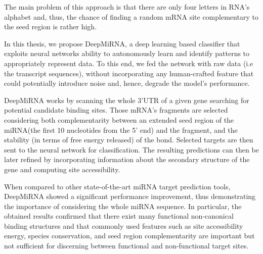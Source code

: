 The main problem of this approach is that there are only four letters in RNA's alphabet and, thus, the chance of finding a random mRNA site complementary to the seed region is rather high.

In this thesis, we propose DeepMiRNA, a deep learning based classifier that exploits neural networks ability to autonomously learn and identify patterns to appropriately represent data. To this end, we fed the network with raw data (i.e the transcript sequences), without incorporating any human-crafted feature that could potentially introduce noise and, hence, degrade the model's performance. 

DeepMiRNA works by scanning the whole 3'UTR of a given gene searching for potential candidate binding sites. Those mRNA's fragments are selected considering both complementarity between an extended seed region of the miRNA(the first 10 nucleotides from the 5' end)  and the fragment, and the stability (in terms of free energy released) of the bond. Selected targets are then sent to the neural network for classification. The resulting predictions can then be later refined by incorporating information about the secondary structure of the gene and computing site accessibility.

When compared to other state-of-the-art miRNA target prediction tools, DeepMiRNA showed a significant performance improvement, thus demonstrating the importance of considering the whole miRNA sequence.  In particular, the obtained results confirmed that there exist many functional non-canonical binding structures and that commonly used features such as site accessibility energy, species conservation, and seed region complementarity are important but not sufficient for discerning between functional and non-functional target sites.  